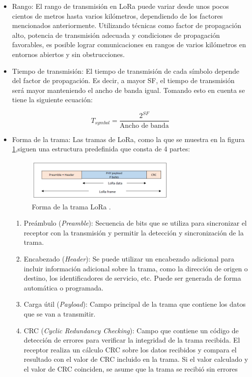 \begin{itemize}
    \item Rango: El rango de transmisión en LoRa puede variar desde unos pocos cientos de metros hasta varios kilómetros, dependiendo de los factores mencionados anteriormente. Utilizando técnicas como factor de propagación alto, potencia de transmisión adecuada y condiciones de propagación favorables, es posible lograr comunicaciones en rangos de varios kilómetros en entornos abiertos y sin obstrucciones.
    
    \item Tiempo de transmisión: El tiempo de transmisión de cada símbolo depende del factor de propagación. Es decir, a mayor SF, el tiempo de transmisión será mayor manteniendo el ancho de banda igual. Tomando esto en cuenta se tiene la siguiente ecuación:
    
    \begin{equation}
        T_{symbol} = \frac{2^{SF}}{\text{Ancho de banda}}
    \end{equation}

    \item Forma de la trama: Las tramas de LoRa, como la que se muestra en la figura \ref{fig:trama},siguen una estructura predefinida que consta de 4 partes:
    
    \begin{figure}[H]
        \centering
        \includegraphics[width = 0.7\textwidth]{imagenes/cap1_marcoteo/FormatramaLora.png}
        \caption{Forma de la trama LoRa \citep{aloufi2020hybrid}.}
        \label{fig:trama}
    \end{figure}

    \begin{enumerate}
        \item Preámbulo (\textit{Preamble}): Secuencia de bits que se utiliza para sincronizar el receptor con la transmisión y permitir la detección y sincronización de la trama.
        \item Encabezado (\textit{Header}): Se puede utilizar un encabezado adicional para incluir información adicional sobre la trama, como la dirección de origen o destino, los identificadores de servicio, etc. Puede ser generada de forma automática o programada.
        \item Carga útil (\textit{Payload}): Campo principal de la trama que contiene los datos que se van a transmitir. 
        \item CRC (\textit{Cyclic Redundancy Checking}): Campo que contiene un código de detección de errores para verificar la integridad de la trama recibida. El receptor realiza un cálculo CRC sobre los datos recibidos y compara el resultado con el valor de CRC incluido en la trama. Si el valor calculado y el valor de CRC coinciden, se asume que la trama se recibió sin errores
    \end{enumerate}




\end{itemize}
